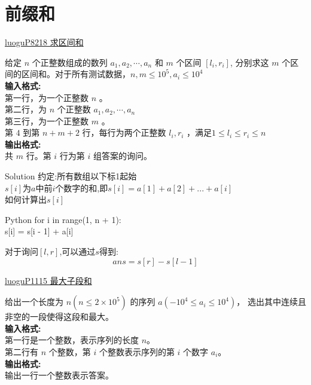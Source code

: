 \documentclass[aspectratio=169,xcolor=dvipsnames]{beamer}
\begin{document}
\section{前缀和}
\begin{frame}{\href{https://www.luogu.com.cn/problem/P8218}{luoguP8218 求区间和}}

    给定 $n$ 个正整数组成的数列 $a_1, a_2, \cdots, a_n$ 和 $m$ 个区间 $[l_i,r_i]$,
    分别求这 $m$ 个区间的区间和。对于所有测试数据，$n,m\le10^5,a_i\le 10^4$\\
    \textbf{输入格式:}\\
    第一行，为一个正整数 $n$ 。\\
    第二行，为 $n$ 个正整数 $a_1,a_2, \cdots ,a_n$\\
    第三行，为一个正整数 $m$ 。\\
    第 $4$ 到第 $n+m+2$ 行，每行为两个正整数 $l_i,r_i$ ，满足$1\le l_i\le r_i\le n$\\
    \textbf{输出格式:}\\
    共 $m$ 行。第 $i$ 行为第 $i$ 组答案的询问。

\end{frame}

\begin{frame}{Solution}
    约定:所有数组以下标1起始\\[20pt]
    $s[i]$为$a$中前$i$个数字的和,即$s[i]=a[1]+a[2]+...+a[i]$\\

    如何计算出$s[i]$
    \begin{block}{Python}
        for i in range(1, n + 1):\\
        \quad s[i] = s[i - 1] + a[i]
    \end{block}

    对于询问$[l,r]$,可以通过$s$得到:\\
    $$ans=s[r]-s[l-1]$$

\end{frame}

\begin{frame}{\href{https://www.luogu.com.cn/problem/P1115}{luoguP1115 最大子段和}}

    给出一个长度为 $n(n \le 2 \times 10^5)$ 的序列 $a(-10^4 \le a_i \le 10^4)$，
    选出其中连续且非空的一段使得这段和最大。\\
    \textbf{输入格式:}\\
    第一行是一个整数，表示序列的长度 $n$。\\
    第二行有 $n$ 个整数，第 $i$ 个整数表示序列的第 $i$ 个数字 $a_i$。\\
    \textbf{输出格式:}\\
    输出一行一个整数表示答案。

\end{frame}
\end{document}
